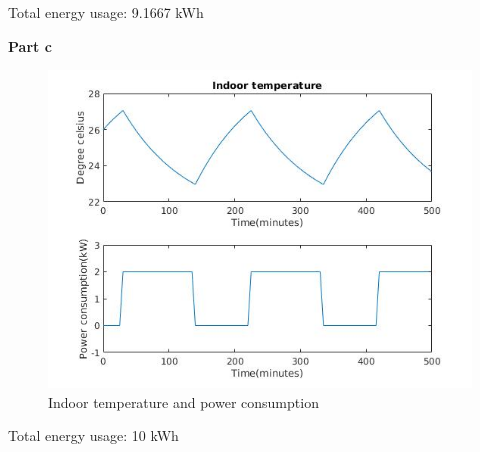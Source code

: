 \documentclass[11pt]{article}
\begin{document}
Total energy usage: 9.1667 kWh

\noindent
\textbf{Part c} \\
\begin{figure}[H]
    \centering
    \includegraphics[scale=0.5]{figs/q5_c.jpg}
    \caption{Indoor temperature and power consumption}
    \label{fig::q5c}
\end{figure}

Total energy usage: 10 kWh
\end{document}
